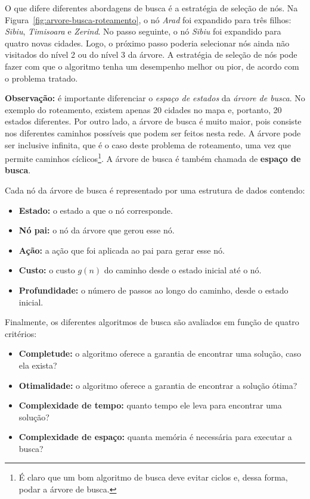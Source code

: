 O que difere diferentes abordagens de busca é a estratégia de seleção de nós. Na Figura~\ref{fig:arvore-busca-roteamento}, o nó \textit{Arad} foi expandido para três filhos: \textit{Sibiu}, \textit{Timisoara} e \textit{Zerind}. No passo seguinte, o nó \textit{Sibiu} foi expandido para quatro novas cidades. Logo, o próximo passo poderia selecionar nós ainda não visitados do nível 2 ou do nível 3 da árvore. A estratégia de seleção de nós pode fazer com que o algoritmo tenha um desempenho melhor ou pior, de acordo com o problema tratado.

\textbf{Observação:} é importante diferenciar o \textit{espaço de estados} da \textit{árvore de busca}. No exemplo do roteamento, existem apenas 20 cidades no mapa e, portanto, 20 estados diferentes. Por outro lado, a árvore de busca é muito maior, pois consiste nos diferentes caminhos possíveis que podem ser feitos nesta rede. A árvore pode ser inclusive infinita, que é o caso deste problema de roteamento, uma vez que permite caminhos cíclicos\footnote{É claro que um bom algoritmo de busca deve evitar ciclos e, dessa forma, podar a árvore de busca.}. A árvore de busca é também chamada de \textbf{espaço de busca}.

\insertspace

Cada nó da árvore de busca é representado por uma estrutura de dados contendo:
\begin{itemize}
	\item \textbf{Estado:} o estado a que o nó corresponde.
	\item \textbf{Nó pai:} o nó da árvore que gerou esse nó.
	\item \textbf{Ação:} a ação que foi aplicada ao pai para gerar esse nó.
	\item \textbf{Custo:} o custo $g(n)$ do caminho desde o estado inicial até o nó.
	\item \textbf{Profundidade:} o número de passos ao longo do caminho, desde o estado inicial.
\end{itemize}

\insertspace

Finalmente, os diferentes algoritmos de busca são avaliados em função de quatro critérios:
\begin{itemize}
	\item \textbf{Completude:} o algoritmo oferece a garantia de encontrar uma solução, caso ela exista?
	
	\item \textbf{Otimalidade:} o algoritmo oferece a garantia de encontrar a solução ótima?
	
	\item \textbf{Complexidade de tempo:} quanto tempo ele leva para encontrar uma solução?
	
	\item \textbf{Complexidade de espaço:} quanta memória é necessária para executar a busca?
\end{itemize}

